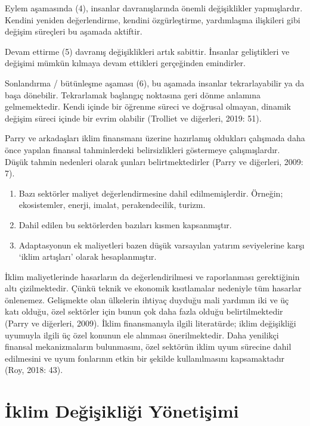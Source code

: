 \documentclass[
]{book}
\begin{document}
Eylem aşamasında (4), insanlar davranışlarında önemli değişiklikler yapmışlardır. Kendini yeniden değerlendirme, kendini özgürleştirme, yardımlaşma ilişkileri gibi değişim süreçleri bu aşamada aktiftir.

Devam ettirme (5) davranış değişiklikleri artık sabittir. İnsanlar geliştikleri ve değişimi mümkün kılmaya devam ettikleri gerçeğinden emindirler.

Sonlandırma / bütünleşme aşaması (6), bu aşamada insanlar tekrarlayabilir ya da başa dönebilir. Tekrarlamak başlangıç noktasına geri dönme anlamına gelmemektedir. Kendi içinde bir öğrenme süreci ve doğrusal olmayan, dinamik değişim süreci içinde bir evrim olabilir (Trolliet ve diğerleri, 2019: 51).

Parry ve arkadaşları iklim finansmanı üzerine hazırlamış oldukları çalışmada daha önce yapılan finansal tahminlerdeki belirsizlikleri göstermeye çalışmışlardır. Düşük tahmin nedenleri olarak şunları belirtmektedirler (Parry ve diğerleri, 2009: 7).

\begin{enumerate}
\def\labelenumi{\arabic{enumi})}
\item
  Bazı sektörler maliyet değerlendirmesine dahil edilmemişlerdir. Örneğin; ekosistemler, enerji, imalat, perakendecilik, turizm.
\item
  Dahil edilen bu sektörlerden bazıları kısmen kapsanmıştır.
\item
  Adaptasyonun ek maliyetleri bazen düşük varsayılan yatırım seviyelerine karşı `iklim artışları' olarak hesaplanmıştır.
\end{enumerate}

İklim maliyetlerinde hasarların da değerlendirilmesi ve raporlanması gerektiğinin altı çizilmektedir. Çünkü teknik ve ekonomik kısıtlamalar nedeniyle tüm hasarlar önlenemez. Gelişmekte olan ülkelerin ihtiyaç duyduğu mali yardımın iki ve üç katı olduğu, özel sektörler için bunun çok daha fazla olduğu belirtilmektedir (Parry ve diğerleri, 2009). İklim finansmanıyla ilgili literatürde; iklim değişikliği uyumuyla ilgili üç özel konunun ele alınması önerilmektedir. Daha yenilikçi finansal mekanizmaların bulunmasını, özel sektörün iklim uyum sürecine dahil edilmesini ve uyum fonlarının etkin bir şekilde kullanılmasını kapsamaktadır (Roy, 2018: 43).

\hypertarget{iklim-deux11fiux15fikliux11fi-yuxf6netiux15fimi}{%
\section{İklim Değişikliği Yönetişimi}\label{iklim-deux11fiux15fikliux11fi-yuxf6netiux15fimi}}
\end{document}
